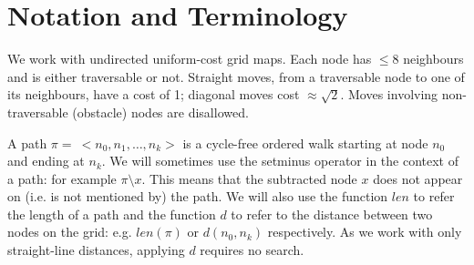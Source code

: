 \section{Notation and Terminology}
\label{sec:notation}
We work with undirected uniform-cost grid maps.
Each node has $\leq 8$ neighbours and is either traversable or not. 
Straight moves, from a traversable node to one of its neighbours, 
have a cost of 1; diagonal moves cost $\approx\sqrt 2$.
Moves involving non-traversable (obstacle) nodes are disallowed.

A path $\pi =~<n_{0}, n_{1}, \ldots , n_{k}>$ is a
cycle-free ordered walk starting at node $n_{0}$ and ending at 
$n_{k}$.
We will sometimes use the setminus operator in the context of a path:
for example $\pi \setminus x$. This means that the subtracted node $x$
does not appear on (i.e. is not mentioned by) the path. 
We will also use the function $len$ to refer the length of a path 
and the function $d$ to refer to the distance between two nodes 
on the grid: e.g. $len(\pi)$ or $d(n_{0}, n_{k})$ respectively.
As we work with only straight-line distances, applying $d$ requires no search.



